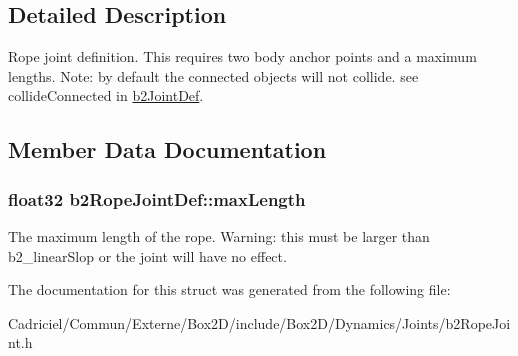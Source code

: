 \subsection{Detailed Description}
Rope joint definition. This requires two body anchor points and a maximum lengths. Note\+: by default the connected objects will not collide. see collide\+Connected in \hyperlink{structb2_joint_def}{b2\+Joint\+Def}. 

\subsection{Member Data Documentation}
\subsubsection[{\texorpdfstring{max\+Length}{maxLength}}]{\setlength{\rightskip}{0pt plus 5cm}float32 b2\+Rope\+Joint\+Def\+::max\+Length}\hypertarget{structb2_rope_joint_def_a6efdcae22e2bdcfc3aae62da1a5f0d69}{}\label{structb2_rope_joint_def_a6efdcae22e2bdcfc3aae62da1a5f0d69}
The maximum length of the rope. Warning\+: this must be larger than b2\+\_\+linear\+Slop or the joint will have no effect. 

The documentation for this struct was generated from the following file\+:\begin{DoxyCompactItemize}
\item 
Cadriciel/\+Commun/\+Externe/\+Box2\+D/include/\+Box2\+D/\+Dynamics/\+Joints/b2\+Rope\+Joint.\+h\end{DoxyCompactItemize}
